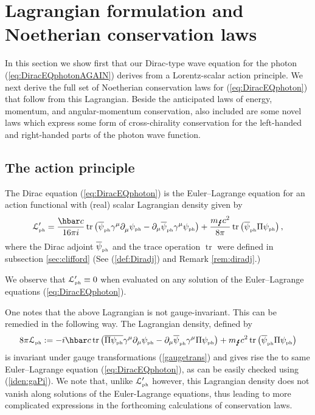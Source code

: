 \documentclass[11pt]{article}
\theoremstyle{definition}
\DeclareMathOperator{\tr}{tr}
\newcommand{\refeq}[1]{(\ref{#1})}
\numberwithin{equation}{section}
\newcommand{\beq}{\begin{equation}}
\newcommand{\eeq}{\end{equation}}
\newcommand{\p}{\partial}
\newcommand{\cLph}{{\mathcal L}_{\mbox{\tiny{ph}}}}
\newcommand{\psiPH}{{\psi_{\mbox{\rm\tiny ph}}}}
\newcommand{\psiPHb}{{\overline\psi_{\mbox{\rm\tiny ph}}}}
\newcommand{\mPH}{{m_{\mbox{\Lightning}}}}
\newcommand{\ga}{\gamma}
\begin{document}
\section{Lagrangian formulation and Noetherian conservation laws}\label{sec:conservation}
 In this section we show first that our Dirac-type wave equation for the photon \refeq{eq:DiracEQphotonAGAIN} 
derives from a Lorentz-scalar action principle.
 We next derive the full set of Noetherian conservation laws for (\ref{eq:DiracEQphoton}) that follow from this Lagrangian.
 Beside the anticipated laws of energy, momentum, and angular-momentum conservation, also included are some novel laws which express
some form of cross-chirality conservation for the left-handed and right-handed parts of the photon wave function. 
 
\subsection{The action principle}\label{sec:action}
The Dirac equation \refeq{eq:DiracEQphoton} is the Euler--Lagrange equation for an action functional with (real) scalar Lagrangian density given by
\beq \label{Lagrangian}
\cLph'=  
 \frac{\hbar c}{16\pi i} \tr\left({\psiPHb} \gamma^\mu_{} \p_\mu^{} \psiPH - \p_\mu \psiPHb \ga^\mu \psiPH\right) 
+ \frac{\mPH c^2}{8 \pi} \tr \left( \psiPHb \Pi \psiPH \right),
\eeq
where the Dirac adjoint $\psiPHb$ and the trace operation $\tr$ were defined in subsection \ref{sec:clifford} 
(See \refeq{def:Diradj} and Remark \ref{rem:diradj}.)

 We  observe that $\cLph' \equiv 0$ when evaluated on any solution of the Euler--Lagrange equations \refeq{eq:DiracEQphoton}. 

 One notes that the above Lagrangian is not gauge-invariant.  
 This can be remedied in the following way.  
 The Lagrangian density, defined by
\beq \label{gaugeinvlag}
8\pi \cLph:= -i \hbar c \tr \left( \overline{\Pi\psiPH} \ga^\mu \p_\mu \psiPH - \p_\mu\psiPHb \ga^\mu \Pi \psiPH \right) 
+ \mPH c^2 \tr \left( \psiPHb \Pi \psiPH \right)
\eeq
is invariant under gauge transformations \refeq{gaugetrans} and gives rise the to same Euler--Lagrange equation \refeq{eq:DiracEQphoton},
as can be easily checked using \refeq{iden:gaPi}. 
 We note that, unlike $\cLph'$ however, this Lagrangian density does not vanish along solutions of the Euler-Lagrange equations,
thus leading to more complicated expressions in the forthcoming calculations of conservation laws.
\end{document}
